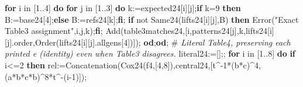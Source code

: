 \documentclass[
  10pt,
  letterpaper,
]{article}
\newenvironment{Shaded}{}{}
\newcommand{\BuiltInTok}[1]{\textcolor[rgb]{0.00,0.50,0.00}{#1}}
\newcommand{\CommentTok}[1]{\textcolor[rgb]{0.38,0.63,0.69}{\textit{#1}}}
\newcommand{\ConstantTok}[1]{\textcolor[rgb]{0.53,0.00,0.00}{#1}}
\newcommand{\ControlFlowTok}[1]{\textcolor[rgb]{0.00,0.44,0.13}{\textbf{#1}}}
\newcommand{\ExtensionTok}[1]{#1}
\newcommand{\FloatTok}[1]{\textcolor[rgb]{0.25,0.63,0.44}{#1}}
\newcommand{\NormalTok}[1]{#1}
\newcommand{\OperatorTok}[1]{\textcolor[rgb]{0.40,0.40,0.40}{#1}}
\newcommand{\StringTok}[1]{\textcolor[rgb]{0.25,0.44,0.63}{#1}}
\newcommand{\VariableTok}[1]{\textcolor[rgb]{0.10,0.09,0.49}{#1}}
\begin{document}
\begin{Shaded}
\begin{Highlighting}[]
\ControlFlowTok{for} \VariableTok{i} \ExtensionTok{in}\NormalTok{ [}\FloatTok{1}\OperatorTok{..}\FloatTok{4}\NormalTok{] }\ControlFlowTok{do} \ControlFlowTok{for} \VariableTok{j} \ExtensionTok{in}\NormalTok{ [}\FloatTok{1}\OperatorTok{..}\FloatTok{3}\NormalTok{] }\ControlFlowTok{do}
 \VariableTok{k}\OperatorTok{:=}\VariableTok{expected24}\NormalTok{[}\VariableTok{i}\NormalTok{][}\VariableTok{j}\NormalTok{]}\OperatorTok{;}\ControlFlowTok{if} \VariableTok{k}\OperatorTok{=}\FloatTok{9} \ControlFlowTok{then} \VariableTok{B}\OperatorTok{:=}\VariableTok{base24}\NormalTok{[}\FloatTok{4}\NormalTok{]}\OperatorTok{;}\ControlFlowTok{else} \VariableTok{B}\OperatorTok{:=}\VariableTok{refs24}\NormalTok{[}\VariableTok{k}\NormalTok{]}\OperatorTok{;}\ControlFlowTok{fi}\OperatorTok{;}
 \ControlFlowTok{if} \ConstantTok{not} \VariableTok{Same24}\NormalTok{(}\VariableTok{lifts24}\NormalTok{[}\VariableTok{i}\NormalTok{][}\VariableTok{j}\NormalTok{]}\OperatorTok{,}\VariableTok{B}\NormalTok{) }\ControlFlowTok{then} \BuiltInTok{Error}\NormalTok{(}\StringTok{"Exact Table3 assignment"}\OperatorTok{,}\VariableTok{i}\OperatorTok{,}\VariableTok{j}\OperatorTok{,}\VariableTok{k}\NormalTok{)}\OperatorTok{;}\ControlFlowTok{fi}\OperatorTok{;}
 \BuiltInTok{Add}\NormalTok{(}\VariableTok{table3matches24}\OperatorTok{,}\NormalTok{[}\VariableTok{i}\OperatorTok{,}\VariableTok{patterns24}\NormalTok{[}\VariableTok{j}\NormalTok{]}\OperatorTok{,}\VariableTok{k}\OperatorTok{,}\VariableTok{lifts24}\NormalTok{[}\VariableTok{i}\NormalTok{][}\VariableTok{j}\NormalTok{].}\VariableTok{order}\OperatorTok{,}\BuiltInTok{Order}\NormalTok{(}\VariableTok{lifts24}\NormalTok{[}\VariableTok{i}\NormalTok{][}\VariableTok{j}\NormalTok{].}\VariableTok{allgens}\NormalTok{[}\FloatTok{4}\NormalTok{])])}\OperatorTok{;}
\ControlFlowTok{od}\OperatorTok{;}\ControlFlowTok{od}\OperatorTok{;}
\NormalTok{\#}\CommentTok{ Literal Table4, preserving each printed e (identity) even when Table3 disagrees.}
\VariableTok{literal24}\OperatorTok{:=}\NormalTok{[]}\OperatorTok{;;}
\ControlFlowTok{for} \VariableTok{i} \ExtensionTok{in}\NormalTok{ [}\FloatTok{1}\OperatorTok{..}\FloatTok{8}\NormalTok{] }\ControlFlowTok{do}
 \ControlFlowTok{if} \VariableTok{i}\OperatorTok{\textless{}=}\FloatTok{2} \ControlFlowTok{then} \VariableTok{rel}\OperatorTok{:=}\BuiltInTok{Concatenation}\NormalTok{(}\VariableTok{Cox24}\NormalTok{(}\VariableTok{f4}\OperatorTok{,}\NormalTok{[}\FloatTok{4}\OperatorTok{,}\FloatTok{8}\NormalTok{])}\OperatorTok{,}\VariableTok{central24}\OperatorTok{,}\NormalTok{[}\VariableTok{t}\OperatorTok{\^{}{-}}\FloatTok{1}\OperatorTok{*}\NormalTok{(}\VariableTok{b}\OperatorTok{*}\VariableTok{c}\NormalTok{)}\OperatorTok{\^{}}\FloatTok{4}\OperatorTok{,}\NormalTok{(}\VariableTok{a}\OperatorTok{*}\VariableTok{b}\OperatorTok{*}\VariableTok{c}\OperatorTok{*}\VariableTok{b}\NormalTok{)}\OperatorTok{\^{}}\FloatTok{8}\OperatorTok{*}\VariableTok{t}\OperatorTok{\^{}{-}}\NormalTok{(}\VariableTok{i}\OperatorTok{{-}}\FloatTok{1}\NormalTok{)])}\OperatorTok{;}

\end{Highlighting}
\end{Shaded}
\end{document}

